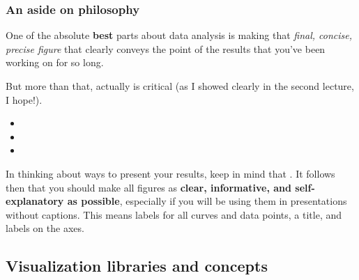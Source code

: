 \documentclass[hyperref={colorlinks=true}]{beamer}
\begin{document}
\begin{frame}%
  \frametitle{An aside on philosophy}
  
  One of the absolute \textbf{best} parts about data analysis is making that \textit{final, concise, precise figure} that clearly conveys the point of the results that you've been working on for so long.
  
  But more than that, actually  is critical (as I showed clearly in the second lecture, I hope!).
  
  \begin{itemize}
    \item {}
    \item {}
    \item {}
  \end{itemize}
  
  In thinking about ways to present your results, keep in mind that . It follows then that you should make all figures as \textbf{clear, informative, and self-explanatory as possible}, especially if you will be using them in presentations without captions. This means labels for all curves and data points, a title, and labels on the axes.

\end{frame}

\subsection[Visualization libraries and concepts]{Visualization libraries and concepts}
\end{document}
